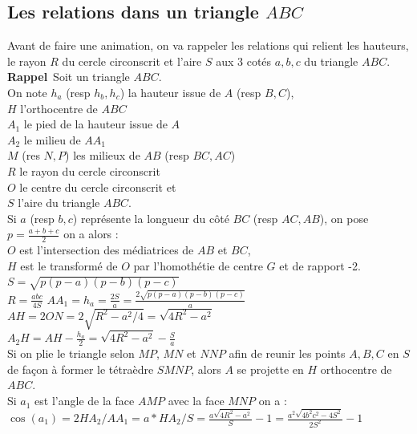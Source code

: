 \documentclass[a4paper,11pt]{book}
\begin{document}
\subsection{Les relations dans un triangle $ABC$}
Avant de faire une animation, on va rappeler les relations qui relient les 
hauteurs, le rayon $R$ du cercle circonscrit et l'aire $S$ aux 3 cot\'es 
$a,b,c$ du triangle $ABC$.\\
{\bf Rappel}\
Soit un triangle $ABC$.\\
On note $h_a$ (resp $h_b,h_c$) la hauteur issue de $A$ (resp $B,C$),\\
$H$ l'orthocentre de $ABC$\\
$A_1$ le pied de la hauteur issue de $A$\\ 
$A_2$ le milieu de $AA_1$\\
$M$ (res $N,P$) les milieux de $AB$ (resp $BC,AC$)\\
$R$ le rayon du cercle circonscrit\\
$O$ le centre du cercle circonscrit et\\
$S$ l'aire du triangle $ABC$.\\
Si $a$ (resp $b,c$) repr\'esente la longueur du c\^ot\'e $BC$ (resp $AC,AB$),
on pose $\displaystyle p=\frac{a+b+c}{2}$ on a alors :\\
$O$ est l'intersection des m\'ediatrices de $AB$ et $BC$,\\
$H$ est le transform\'e de $O$ par l'homoth\'etie de centre $G$ et de 
rapport -2.\\
$\displaystyle S=\sqrt{p(p-a)(p-b)(p-c)}$\\
$\displaystyle R=\frac{abc}{4S}$
$AA_1=h_a=\frac{2S}{a}=\frac{2\sqrt{p(p-a)(p-b)(p-c)}}{a}$\\
$AH=2ON=2\sqrt{R^2-a^2/4}=\sqrt{4R^2-a^2}$\\
$\displaystyle A_2H=AH-\frac{h_a}{2}=\sqrt{4R^2-a^2}-\frac{S}{a}$\\
Si on plie le triangle selon $MP$, $MN$ et $NNP$ afin de reunir les points 
$A,B,C$ en $S$ de fa\c{c}on \`a former le t\'etra\`edre $SMNP$, alors $A$ se 
projette en $H$ orthocentre de $ABC$.\\ 
Si $a_1$ est l'angle de la face $AMP$ avec la face $MNP$ on a  :\\
$\displaystyle \cos(a_1)=2HA_2/AA_1=a*HA_2/S=\frac{a\sqrt{4R^2-a^2}}{S}-1=
\frac{a^2\sqrt{4b^2c^2-4S^2}}{2S^2}-1$\\
\end{document}
